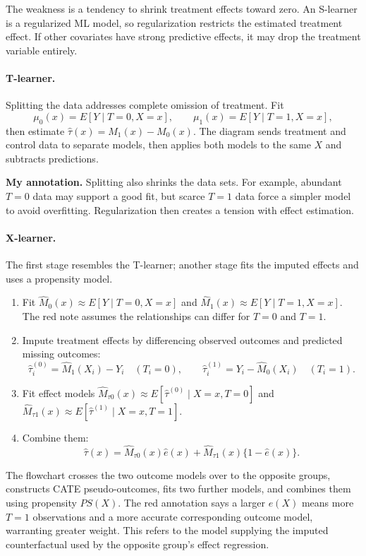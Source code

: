 The weakness is a tendency to shrink treatment effects toward zero. An S-learner is a regularized ML model, so regularization restricts the estimated treatment effect. If other covariates have strong predictive effects, it may drop the treatment variable entirely.

\paragraph{T-learner.}
Splitting the data addresses complete omission of treatment. Fit
\[\mu_0(x)=E[Y\mid T=0,X=x],\qquad \mu_1(x)=E[Y\mid T=1,X=x],\]
then estimate $\hat\tau(x)=M_1(x)-M_0(x)$. The diagram sends treatment and control data to separate models, then applies both models to the same $X$ and subtracts predictions.

\textbf{My annotation.} Splitting also shrinks the data sets. For example, abundant $T=0$ data may support a good fit, but scarce $T=1$ data force a simpler model to avoid overfitting. Regularization then creates a tension with effect estimation.

\paragraph{X-learner.}
The first stage resembles the T-learner; another stage fits the imputed effects and uses a propensity model.
\begin{enumerate}
\item Fit $\hat M_0(x)\approx E[Y\mid T=0,X=x]$ and $\hat M_1(x)\approx E[Y\mid T=1,X=x]$. The red note assumes the relationships can differ for $T=0$ and $T=1$.
\item Impute treatment effects by differencing observed outcomes and predicted missing outcomes:
\[\hat\tau_i^{(0)}=\hat M_1(X_i)-Y_i\quad(T_i=0),\qquad
\hat\tau_i^{(1)}=Y_i-\hat M_0(X_i)\quad(T_i=1).
\]
\item Fit effect models $\hat M_{\tau0}(x)\approx E[\hat\tau^{(0)}\mid X=x,T=0]$ and $\hat M_{\tau1}(x)\approx E[\hat\tau^{(1)}\mid X=x,T=1]$.
\item Combine them:
\[\hat\tau(x)=\hat M_{\tau0}(x)\hat e(x)+\hat M_{\tau1}(x)\{1-\hat e(x)\}.\]
\end{enumerate}
The flowchart crosses the two outcome models over to the opposite groups, constructs CATE pseudo-outcomes, fits two further models, and combines them using propensity $PS(X)$. The red annotation says a larger $e(X)$ means more $T=1$ observations and a more accurate corresponding outcome model, warranting greater weight. This refers to the model supplying the imputed counterfactual used by the opposite group's effect regression.

